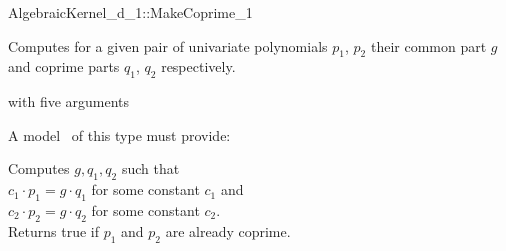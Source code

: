 \begin{ccRefFunctionObjectConcept}{AlgebraicKernel_d_1::MakeCoprime_1}

\ccDefinition
Computes for a given pair of univariate polynomials $p_1$, $p_2$ their
common part $g$ and coprime parts $q_1$, $q_2$ respectively.

\ccRefines 
{} with five arguments 

\ccTypes
{}

A model \ccVar\ of this type must provide:

{ Computes $g, q_1, q_2$ such that\\
$c_1 \cdot p_1 =  g \cdot q_1$ for some constant $c_1$ and\\
$c_2 \cdot p_2 =  g \cdot q_2$ for some constant $c_2$.\\
Returns true if $p_1$ and $p_2$ are already coprime. 
}

\ccSeeAlso
{}\\

\end{ccRefFunctionObjectConcept}
